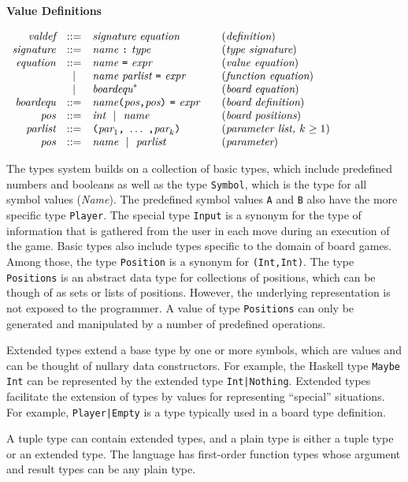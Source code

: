 \documentclass[11pt]{article}
\makeatletter
\newcommand{\prodName}[1]{&(\emph{#1})\\}
\newcommand{\nt}[1]{\textit{#1}}
\newcommand{\prog}[1]{\texttt{#1}}
\newcommand{\ORil}{\ \ |\ \ }
\newcommand{\IS}{&::=&}
\newcommand{\OR}{&|&}
\newcommand{\syntax}[2]{
  \needspace{3\baselineskip}
  \bigskip\par\noindent\textbf{#1}\par\smallskip%
  $\begin{array}{rcl@{\qquad}l}#2\end{array}$%
  \par\bigskip\noindent\ignorespaces
}
\newcommand{\lp}{\prog{(}}
\newcommand{\rp}{\prog{)}}
\newcommand{\paren}[1]{\lp#1\rp}
\newcommand{\pair}[2]{\paren{#1\prog{,}#2}}
\makeatother
\begin{document}
\syntax{Value Definitions}{
\nt{valdef}    \IS \nt{signature}\ \nt{equation}   \prodName{definition}
\nt{signature} \IS \nt{name}\ \prog{:}\ \nt{type}  \prodName{type signature}
\nt{equation}  \IS \nt{name}\ \prog{=}\ \nt{expr}  \prodName{value equation}
               \OR \nt{name}\ \nt{parlist}\ \prog{=}\ \nt{expr}
                   \prodName{function equation}
               \OR \nt{boardequ}^*                  \prodName{board equation}
\nt{boardequ}  \IS \nt{name}\pair{\nt{pos}}{\nt{pos}}\ \prog{=}\ \nt{expr}
                   \prodName{board definition}
\nt{pos}       \IS \nt{int} \ORil \nt{name}      \prodName{board positions}
\nt{parlist}   \IS \paren{\nt{par}_1\prog{,}\ \ldots\ \prog{,}\nt{par}_k}
                   \prodName{parameter list, $k\geq 1$}
\nt{pos}       \IS \nt{name} \ORil \nt{parlist}   \prodName{parameter}
}
%
The types system builds on a collection of basic types, which include
predefined numbers and booleans as well as the type \prog{Symbol}, which is the
type for all symbol values (\nt{Name}). The predefined symbol values \prog{A}
and \prog{B} also have the more specific type \prog{Player}. The special type
\prog{Input} is a synonym for the type of information that is gathered from the
user in each move during an execution of the game.
%
Basic types also include types specific to the domain of board games. Among
those, the type \prog{Position} is a synonym for \prog{(Int,Int)}. The type
\prog{Positions} is an abstract data type for collections of positions, which
can be though of as sets or lists of positions. However, the underlying
representation is not exposed to the programmer. A value of type
\prog{Positions} can only be generated and manipulated by a number of
predefined operations.

Extended types extend a base type by one or more symbols, which are values and
can be thought of nullary data constructors. For example, the Haskell type
\prog{Maybe Int} can be represented by the extended type \prog{Int|Nothing}.
Extended types facilitate the extension of types by values for representing
``special'' situations. For example, \prog{Player|Empty} is a type typically
used in a board type definition.

A tuple type can contain extended types, and a plain type is either a tuple
type or an extended type. The language has first-order function types whose
argument and result types can be any plain type.
\end{document}
